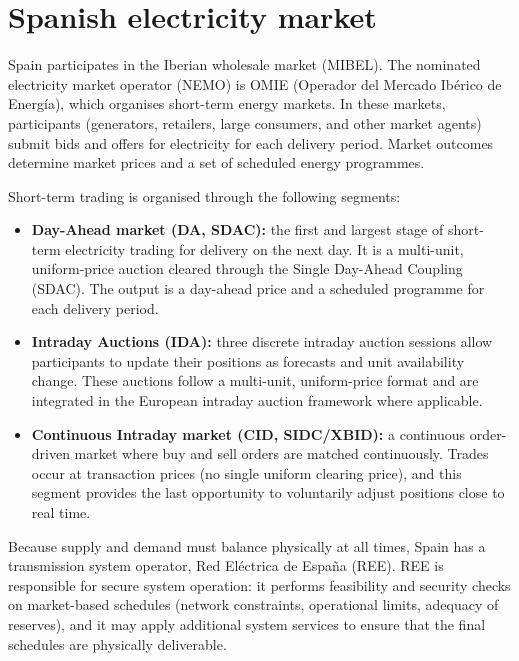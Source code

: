 \documentclass[11pt,a4paper]{article}
\begin{document}
\appendix
\section{Spanish electricity market}\label{app:market}

Spain participates in the Iberian wholesale market (MIBEL). The nominated electricity market operator (NEMO) is OMIE (Operador del Mercado Ibérico de Energía), which organises short-term energy markets. In these markets, participants (generators, retailers, large consumers, and other market agents) submit bids and offers for electricity for each delivery period. Market outcomes determine market prices and a set of scheduled energy programmes.

Short-term trading is organised through the following segments:

\begin{itemize}
  \item \textbf{Day-Ahead market (DA, SDAC):} the first and largest stage of short-term electricity trading for delivery on the next day. It is a multi-unit, uniform-price auction cleared through the Single Day-Ahead Coupling (SDAC). The output is a day-ahead price and a scheduled programme for each delivery period.
  \item \textbf{Intraday Auctions (IDA):} three discrete intraday auction sessions allow participants to update their positions as forecasts and unit availability change. These auctions follow a multi-unit, uniform-price format and are integrated in the European intraday auction framework where applicable.
  \item \textbf{Continuous Intraday market (CID, SIDC/XBID):} a continuous order-driven market where buy and sell orders are matched continuously. Trades occur at transaction prices (no single uniform clearing price), and this segment provides the last opportunity to voluntarily adjust positions close to real time.
\end{itemize}

Because supply and demand must balance physically at all times, Spain has a transmission system operator, Red Eléctrica de España (REE). REE is responsible for secure system operation: it performs feasibility and security checks on market-based schedules (network constraints, operational limits, adequacy of reserves), and it may apply additional system services to ensure that the final schedules are physically deliverable.
\end{document}
